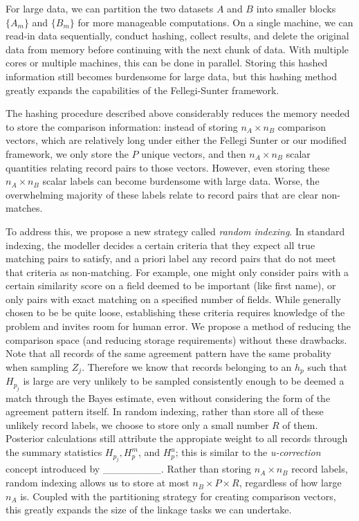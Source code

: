 \documentclass[
  12pt,
]{article}
\begin{document}
For large data, we can partition the two datasets \(A\) and \(B\) into
smaller blocks \(\{A_m\}\) and \(\{B_m\}\) for more manageable
computations. On a single machine, we can read-in data sequentially,
conduct hashing, collect results, and delete the original data from
memory before continuing with the next chunk of data. With multiple
cores or multiple machines, this can be done in parallel. Storing this
hashed information still becomes burdensome for large data, but this
hashing method greatly expands the capabilities of the Fellegi-Sunter
framework.

The hashing procedure described above considerably reduces the memory
needed to store the comparison information: instead of storing
\(n_A \times n_B\) comparison vectors, which are relatively long under
either the Fellegi Sunter or our modified framework, we only store the
\(P\) unique vectors, and then \(n_A \times n_B\) scalar quantities
relating record pairs to those vectors. However, even storing these
\(n_A \times n_B\) scalar labels can become burdensome with large data.
Worse, the overwhelming majority of these labels relate to record pairs
that are clear non-matches.

To address this, we propose a new strategy called \emph{random
indexing}. In standard indexing, the modeller decides a certain criteria
that they expect all true matching pairs to satisfy, and a priori label
any record pairs that do not meet that criteria as non-matching. For
example, one might only consider pairs with a certain similarity score
on a field deemed to be important (like first name), or only pairs with
exact matching on a specified number of fields. While generally chosen
to be be quite loose, establishing these criteria requires knowledge of
the problem and invites room for human error. We propose a method of
reducing the comparison space (and reducing storage requirements)
without these drawbacks. Note that all records of the same agreement
pattern have the same probality when sampling \(Z_j\). Therefore we know
that records belonging to an \(h_p\) such that \(H_{p_j}\) is large are
very unlikely to be sampled consistently enough to be deemed a match
through the Bayes estimate, even without considering the form of the
agreement pattern itself. In random indexing, rather than store all of
these unlikely record labels, we choose to store only a small number
\(R\) of them. Posterior calculations still attribute the appropiate
weight to all records through the summary statistics \(H_{p_j}, H_p^m\),
and \(H_p^u\); this is similar to the \emph{u-correction} concept
introduced by \_\_\_\_\_\_\_\_. Rather than storing \(n_A \times n_B\)
record labels, random indexing allows us to store at most
\(n_B \times P \times R\), regardless of how large \(n_A\) is. Coupled
with the partitioning strategy for creating comparison vectors, this
greatly expands the size of the linkage tasks we can undertake.
\end{document}
